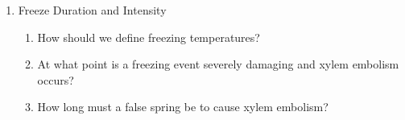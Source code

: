 \documentclass{article}\usepackage[]{graphicx}\usepackage[]{color}
\begin{document}
\begin{siderules}
\begin{enumerate}
\begin{enumerate}
  \end{enumerate}
  \item Freeze Duration and Intensity
  \begin{enumerate}
    \item How should we define freezing temperatures?
    \item At what point is a freezing event severely damaging and xylem embolism occurs?
    \item How long must a false spring be to cause xylem embolism?
  \end{enumerate}
\end{enumerate}
\end{siderules}


\newpage

\end{document}
